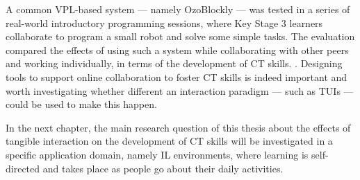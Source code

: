A common \ac{VPL}-based system --- namely OzoBlockly --- was tested in a series of real-world introductory programming sessions, where Key Stage 3 learners collaborate to program a small robot and solve some simple tasks. The evaluation compared the effects of using such a system while collaborating with other peers and working individually, in terms of the development of \ac{CT} skills. . Designing tools to support online collaboration to foster \ac{CT} skills is indeed important and worth investigating whether different an interaction paradigm --- such as \acp{TUI} --- could be used to make this happen.

In the next chapter, the main research question of this thesis about the effects of tangible interaction on the development of \ac{CT} skills will be investigated in a specific application domain, namely \ac{IL} environments, where learning is self-directed and takes place as people go about their daily activities.